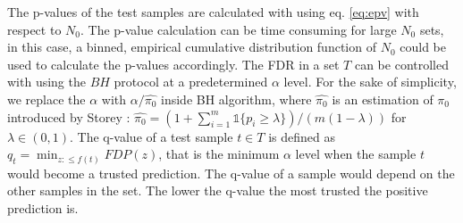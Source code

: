 \documentclass{article}
\newcommand{\mathone}{\mathds{1}}
\begin{document}
The p-values of the test samples are calculated with using eq. \ref{eq:epv} with respect to $N_0$. The p-value calculation can be time consuming for large $N_0$ sets, in this case, a binned, empirical cumulative distribution function of $N_0$ could be used to calculate the p-values accordingly. The FDR in a set $T$ can be controlled with using the $BH$ protocol at a predetermined $\alpha$ level. For the sake of simplicity, we replace the $\alpha$ with $\alpha/\hat{\pi_0}$ inside BH algorithm, where $\hat{\pi_0}$ is an estimation of $\pi_0$ introduced by Storey \cite{storey2004strong}: $\hat{\pi_0} = (1+\sum_{i=1}^m \mathone\{p_i\ge\lambda\} )/(m(1-\lambda))$ for $\lambda\in (0,1)$. The q-value of a test sample $t\in T$ is defined as $q_t=\min_{z:\le f(t)}FDP( z )$, that is the minimum $\alpha$ level when the sample $t$ would become a trusted prediction. The q-value of a sample would depend on the other samples in the set. The lower the q-value the most trusted the positive prediction is.
%
\end{document}
